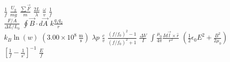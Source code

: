 \documentclass{article}
\begin{document}
\begin{landscape}
\begin{center}
\begin{LARGE}

$\frac{1}{f}$
$\frac{U_g}{mg}$
$\frac{\sum \vec F}{m}$
$\frac{2L}{\lambda}$
$\frac{\omega}{v}$
$\frac{1}{f}$ \\
\vspace{20pt}
$\frac{F/A}{\Delta L/L_0}$
$\oint \vec B \cdot d\vec A$
$k \frac{q_1 q_2}{r}$ \\
\vspace{20pt}
$k_B \ln(w)$
$(3.00 \times 10^8~\mathrm{\frac m s})$
$\lambda p$
$\frac{c}{v}$
$\frac{(f/f_0)^2 - 1}{(f/f_0)^2 + 1}$
$\frac{\Delta V}{I}$
$\int\frac{\mu_0}{4\pi} \frac{I d\vec l \times \hat r}{r^2}$
$(\frac 1 2 \epsilon_0 E^2 + \frac{B^2}{2\mu_0})$
$\left[ \frac{1}{f} - \frac{1}{s'} \right]^{-1}$
$\frac{E}{f}$

\end{LARGE}
\end{center}
\end{landscape}
\end{document}
